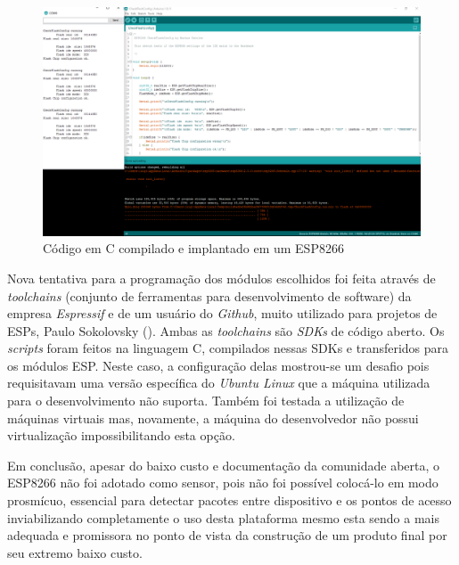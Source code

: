 \begin{figure}[htb]
	\caption{\label{fig:esp-arduino}Código em C compilado e implantado em um ESP8266}
	\begin{center}
		\includegraphics[width=1\textwidth]{040-plataformas/esp-dev/arduino-ide.png}
	\end{center}
\end{figure}


Nova tentativa para a programação  dos módulos escolhidos foi feita através de
\emph{toolchains} (conjunto de ferramentas para desenvolvimento de software) da
empresa \emph{Espressif} e de um usuário do \emph{Github}, muito utilizado para
projetos de ESPs, Paulo Sokolovsky (\cite{Pfalcon}). Ambas as \emph{toolchains}
são \emph{SDKs} de código aberto. Os \emph{scripts} foram feitos na linguagem C,
compilados nessas SDKs e transferidos para os módulos ESP. Neste caso,
a configuração delas mostrou-se um desafio pois requisitavam uma versão
específica do \emph{Ubuntu Linux} que a máquina utilizada para o desenvolvimento
não suporta. Também foi testada a utilização de máquinas virtuais mas, novamente,
a máquina do desenvolvedor não possui virtualização impossibilitando esta opção.

Em conclusão, apesar do baixo custo e documentação da comunidade aberta, o
ESP8266 não foi adotado como sensor, pois não foi possível colocá-lo em modo
prosmícuo, essencial para detectar pacotes entre dispositivo e os pontos de
acesso inviabilizando completamente o uso desta plataforma mesmo esta sendo a
mais adequada e promissora no ponto de vista da construção de um produto final
por seu extremo baixo custo.

